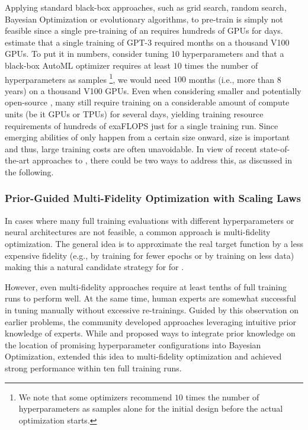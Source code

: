 Applying standard black-box \AutoML approaches, such as grid search, random search, Bayesian Optimization or evolutionary algorithms, to pre-train \LLMs is simply not feasible since a single pre-training of an \LLM requires hundreds of GPUs for days. \cite{brown-neurips20a} estimate that a single training of GPT-3 required months on a thousand V100 GPUs. To put it in numbers, consider tuning $10$ hyperparameters and that a black-box AutoML optimizer requires at least $10$ times the number of hyperparameters as samples \footnote{We note that some optimizers recommend $10$ times the number of hyperparameters as samples alone for the initial design before the actual optimization starts.}, we would need $100$ months (i.e., more than 8 years) on a thousand V100 GPUs. Even when considering smaller and potentially open-source \LLMs, many still require training on a considerable amount of compute units (be it GPUs or TPUs) for several days, yielding training resource requirements of hundreds of exaFLOPS \cite{geiping-icml23a} just for a single training run. Since emerging abilities of \LLMs only happen from a certain size onward, size is important and thus, large training costs are often unavoidable. In view of recent state-of-the-art approaches to \AutoML, there could be two ways to address this, as discussed in the following.

\subsubsection{Prior-Guided Multi-Fidelity Optimization with Scaling Laws}

In cases where many full training evaluations with different hyperparameters or neural architectures are not feasible, a common \AutoML approach is multi-fidelity optimization. The general idea is to approximate the real target function by a less expensive fidelity (e.g., by training for fewer epochs or by training on less data) making this a natural candidate strategy for \HPO for \LLMs.

However, even multi-fidelity approaches require at least tenths of full training runs to perform well. At the same time, human experts are somewhat successful in tuning \LLMs manually without excessive re-trainings. Guided by this observation on earlier \AutoML problems, the community developed approaches leveraging intuitive prior knowledge of experts. While \cite{souza-ecmlpkdd21a} and \cite{hvarfner-iclr22a} proposed ways to integrate prior knowledge on the location of promising hyperparameter configurations into Bayesian Optimization, \cite{mallik-neurips23a} extended this idea to multi-fidelity optimization and achieved strong performance within ten full training runs.

